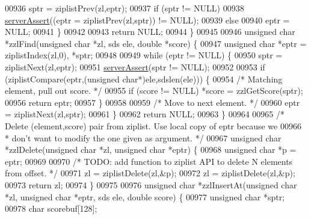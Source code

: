\begin{DoxyCode}
00936         sptr = ziplistPrev(zl,eptr);
00937         \textcolor{keywordflow}{if} (sptr != NULL)
00938             \hyperlink{server_8h_a88114b5169b4c382df6b56506285e56a}{serverAssert}((eptr = ziplistPrev(zl,sptr)) != NULL);
00939         \textcolor{keywordflow}{else}
00940             eptr = NULL;
00941     \}
00942 
00943     \textcolor{keywordflow}{return} NULL;
00944 \}
00945 
00946 \textcolor{keywordtype}{unsigned} \textcolor{keywordtype}{char} *zzlFind(\textcolor{keywordtype}{unsigned} \textcolor{keywordtype}{char} *zl, sds ele, \textcolor{keywordtype}{double} *score) \{
00947     \textcolor{keywordtype}{unsigned} \textcolor{keywordtype}{char} *eptr = ziplistIndex(zl,0), *sptr;
00948 
00949     \textcolor{keywordflow}{while} (eptr != NULL) \{
00950         sptr = ziplistNext(zl,eptr);
00951         \hyperlink{server_8h_a88114b5169b4c382df6b56506285e56a}{serverAssert}(sptr != NULL);
00952 
00953         \textcolor{keywordflow}{if} (ziplistCompare(eptr,(\textcolor{keywordtype}{unsigned} \textcolor{keywordtype}{char}*)ele,sdslen(ele))) \{
00954             \textcolor{comment}{/* Matching element, pull out score. */}
00955             \textcolor{keywordflow}{if} (score != NULL) *score = zzlGetScore(sptr);
00956             \textcolor{keywordflow}{return} eptr;
00957         \}
00958 
00959         \textcolor{comment}{/* Move to next element. */}
00960         eptr = ziplistNext(zl,sptr);
00961     \}
00962     \textcolor{keywordflow}{return} NULL;
00963 \}
00964 
00965 \textcolor{comment}{/* Delete (element,score) pair from ziplist. Use local copy of eptr because we}
00966 \textcolor{comment}{ * don't want to modify the one given as argument. */}
00967 \textcolor{keywordtype}{unsigned} \textcolor{keywordtype}{char} *zzlDelete(\textcolor{keywordtype}{unsigned} \textcolor{keywordtype}{char} *zl, \textcolor{keywordtype}{unsigned} \textcolor{keywordtype}{char} *eptr) \{
00968     \textcolor{keywordtype}{unsigned} \textcolor{keywordtype}{char} *p = eptr;
00969 
00970     \textcolor{comment}{/* TODO: add function to ziplist API to delete N elements from offset. */}
00971     zl = ziplistDelete(zl,&p);
00972     zl = ziplistDelete(zl,&p);
00973     \textcolor{keywordflow}{return} zl;
00974 \}
00975 
00976 \textcolor{keywordtype}{unsigned} \textcolor{keywordtype}{char} *zzlInsertAt(\textcolor{keywordtype}{unsigned} \textcolor{keywordtype}{char} *zl, \textcolor{keywordtype}{unsigned} \textcolor{keywordtype}{char} *eptr, sds ele, \textcolor{keywordtype}{double} score) \{
00977     \textcolor{keywordtype}{unsigned} \textcolor{keywordtype}{char} *sptr;
00978     \textcolor{keywordtype}{char} scorebuf[128];

\end{DoxyCode}

